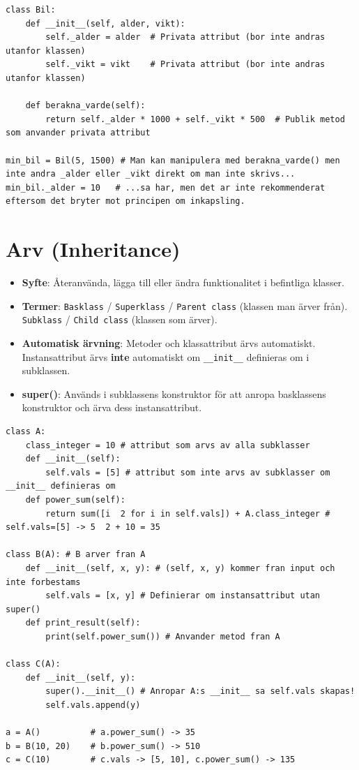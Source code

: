 \documentclass[10pt,a4paper]{report}
\begin{document}
\begin{lstlisting}
class Bil:
    def __init__(self, alder, vikt):
        self._alder = alder  # Privata attribut (bor inte andras utanfor klassen)
        self._vikt = vikt    # Privata attribut (bor inte andras utanfor klassen)

    def berakna_varde(self):
        return self._alder * 1000 + self._vikt * 500  # Publik metod som anvander privata attribut

min_bil = Bil(5, 1500) # Man kan manipulera med berakna_varde() men inte andra _alder eller _vikt direkt om man inte skrivs...
min_bil._alder = 10   # ...sa har, men det ar inte rekommenderat eftersom det bryter mot principen om inkapsling.
\end{lstlisting}

\section{Arv (Inheritance)}

\begin{itemize}[leftmargin=*]
  \item \textbf{Syfte}: Återanvända, lägga till eller ändra funktionalitet i befintliga klasser.
  \item \textbf{Termer}: \texttt{Basklass} / \texttt{Superklass} / \texttt{Parent class} (klassen man ärver från). \texttt{Subklass} / \texttt{Child class} (klassen som ärver).
  \item \textbf{Automatisk ärvning}: Metoder och klassattribut ärvs automatiskt. Instansattribut ärvs \textbf{inte} automatiskt om \texttt{\_\_init\_\_} definieras om i subklassen.
  \item \textbf{super()}: Används i subklassens konstruktor för att anropa basklassens konstruktor och ärva dess instansattribut.
\end{itemize}

\begin{lstlisting}
class A:
    class_integer = 10 # attribut som arvs av alla subklasser
    def __init__(self):
        self.vals = [5] # attribut som inte arvs av subklasser om __init__ definieras om
    def power_sum(self):
        return sum([i  2 for i in self.vals]) + A.class_integer # self.vals=[5] -> 5  2 + 10 = 35

class B(A): # B arver fran A
    def __init__(self, x, y): # (self, x, y) kommer fran input och inte forbestams
        self.vals = [x, y] # Definierar om instansattribut utan super()
    def print_result(self):
        print(self.power_sum()) # Anvander metod fran A

class C(A):
    def __init__(self, y):
        super().__init__() # Anropar A:s __init__ sa self.vals skapas!
        self.vals.append(y)

a = A()          # a.power_sum() -> 35
b = B(10, 20)    # b.power_sum() -> 510
c = C(10)        # c.vals -> [5, 10], c.power_sum() -> 135
\end{lstlisting}
\end{document}
